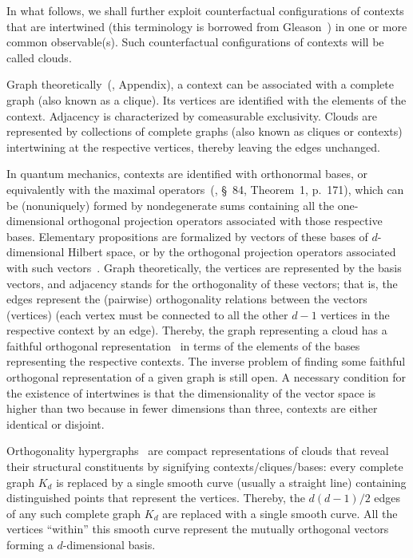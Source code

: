 In what follows, we shall further exploit counterfactual
configurations of contexts that are intertwined (this terminology is borrowed from Gleason~\cite{Gleason})
in one or more common observable(s).
Such counterfactual configurations of contexts will be called {clouds}.

Graph theoretically~(\cite{Godsil-Newman-2008}, Appendix),
a context can be associated with a complete graph (also known as a clique).
Its vertices are identified with the elements of the context.
Adjacency is characterized by comeasurable exclusivity.
Clouds are represented by collections of complete graphs (also known as  cliques
 or contexts) intertwining at the respective vertices,
thereby leaving the edges unchanged.


In quantum mechanics, contexts are identified with orthonormal bases,
or equivalently with the maximal operators~(\cite{halmos-vs}, \S~84, Theorem~1, p.~171),
which can be (nonuniquely) formed by nondegenerate sums containing all the one-dimensional orthogonal projection operators
associated with those respective bases.
Elementary propositions are formalized by vectors of these bases of $d$-dimensional Hilbert space,
or by the orthogonal projection operators associated with such vectors~\cite{birkhoff-36}.
Graph theoretically, the vertices are represented by the basis vectors,
and adjacency stands for the orthogonality of these vectors;
that is, the edges represent the (pairwise) orthogonality
relations between the vectors (vertices)
(each vertex must be connected to all the other $d-1$ vertices in the respective context by an edge).
Thereby, the graph representing a cloud
has a faithful orthogonal representation~\cite{lovasz-89,Portillo-2015}
in terms of the elements of the bases representing the respective contexts.
The inverse problem of finding some faithful orthogonal representation of a given graph is still open.
A necessary condition for the existence of intertwines is that the dimensionality of the
vector space is higher than two because in fewer dimensions than three, contexts are either identical or disjoint.

Orthogonality hypergraphs~\cite{greechie:71} are compact representations of clouds
that reveal their structural constituents by signifying contexts/cliques/bases:
every complete graph $K_d$ is replaced by a {single smooth curve} (usually a straight line)
containing distinguished points that represent the vertices.
Thereby, the $d(d - 1)/2$ edges of any such complete graph $K_d$ are replaced with a single smooth curve.
All the vertices ``within'' this smooth curve represent the mutually orthogonal vectors forming a $d$-dimensional basis.



